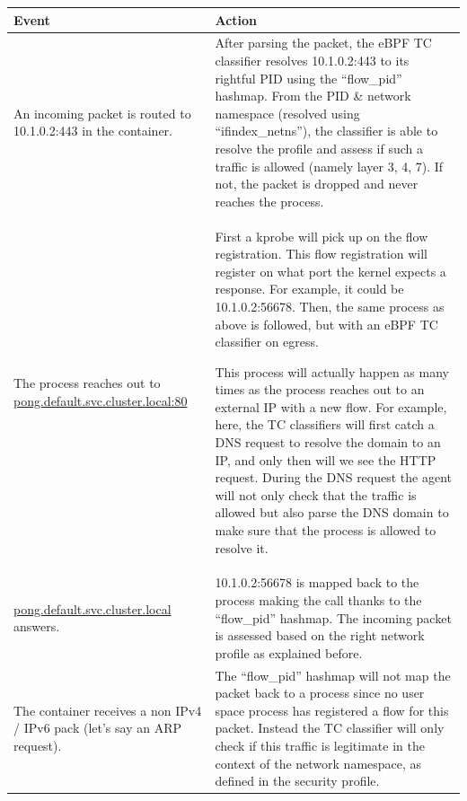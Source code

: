 \begin{table}[p]
  \setlength{\tabcolsep}{5pt}
  \def\arraystretch{1.5}
  \begin{tabular}{|p{}|p{}|}
    \hline \centering Event & \centering Action \tabularnewline

    \hline An incoming packet is routed to 10.1.0.2:443 in the container. & After parsing the packet, the eBPF TC classifier resolves 10.1.0.2:443 to its rightful PID using the “flow\_pid” hashmap. From the PID \& network namespace (resolved using “ifindex\_netns”), the classifier is able to resolve the profile and assess if such a traffic is allowed (namely layer 3, 4, 7). If not, the packet is dropped and never reaches the process. \\

    \hline The process reaches out to \url{pong.default.svc.cluster.local:80} & First a kprobe will pick up on the flow registration. This flow registration will register on what port the kernel expects a response. For example, it could be 10.1.0.2:56678. Then, the same process as above is followed, but with an eBPF TC classifier on egress.

    This process will actually happen as many times as the process reaches out to an external IP with a new flow. For example, here, the TC classifiers will first catch a DNS request to resolve the domain to an IP, and only then will we see the HTTP request. During the DNS request the agent will not only check that the traffic is allowed but also parse the DNS domain to make sure that the process is allowed to resolve it. \\

    \hline \url{pong.default.svc.cluster.local} answers. & 10.1.0.2:56678 is mapped back to the process making the call thanks to the “flow\_pid” hashmap. The incoming packet is assessed based on the right network profile as explained before. \\

    \hline The container receives a non IPv4 / IPv6 pack (let’s say an ARP request). & The “flow\_pid” hashmap will not map the packet back to a process since no user space process has registered a flow for this packet. Instead the TC classifier will only check if this traffic is legitimate in the context of the network namespace, as defined in the security profile. \\

    \hline
  \end{tabular}
\end{table}

